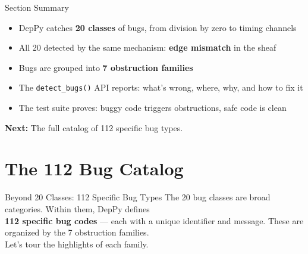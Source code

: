 \documentclass[aspectratio=169,10pt]{beamer}
\begin{document}
\begin{frame}{Section Summary}
\begin{itemize}
  \item DepPy catches \textbf{20 classes} of bugs, from division by zero to timing channels
  \item All 20 detected by the same mechanism: \textbf{edge mismatch} in the sheaf
  \item Bugs are grouped into \textbf{7 obstruction families}
  \item The \texttt{detect\_bugs()} API reports: what's wrong, where, why, and how to fix it
  \item The test suite proves: buggy code triggers obstructions, safe code is clean
\end{itemize}
\vspace{0.3em}
\begin{center}
\textbf{Next:} The full catalog of 112 specific bug types.
\end{center}
\end{frame}

\section{The 112 Bug Catalog}

\begin{frame}{Beyond 20 Classes: 112 Specific Bug Types}
The 20 bug classes are broad categories. Within them, DepPy defines\\
\textbf{112 specific bug codes} --- each with a unique identifier and message.
\vspace{0.5em}
These are organized by the 7 obstruction families.\\
Let's tour the highlights of each family.
\end{frame}
\end{document}
